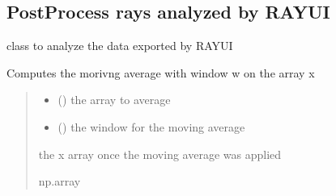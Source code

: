 \documentclass[letterpaper,10pt,english]{sphinxmanual}
\begin{document}
\subsection{PostProcess rays analyzed by RAY\sphinxhyphen{}UI}
\label{\detokenize{API:postprocess-rays-analyzed-by-ray-ui}}

\begin{fulllineitems}
\label{\detokenize{API:raypyng.postprocessing.PostProcessAnalyzed}}
\pysigstartsignatures
\pysigline
{}
\pysigstopsignatures
\sphinxAtStartPar
class to analyze the data exported by RAY\sphinxhyphen{}UI

\begin{fulllineitems}
\label{\detokenize{API:raypyng.postprocessing.PostProcessAnalyzed.moving_average}}
\pysigstartsignatures
\pysiglinewithargsret
{}
{\sphinxparamcomma {}}
{}
\pysigstopsignatures
\sphinxAtStartPar
Computes the morivng average with window w on the array x
\begin{quote}\begin{description}
\begin{itemize}
\item {} 
\sphinxAtStartPar
{} () \textendash{} the array to average

\item {} 
\sphinxAtStartPar
{} () \textendash{} the window for the moving average

\end{itemize}

\sphinxAtStartPar
the x array once the moving average was applied

\sphinxAtStartPar
np.array

\end{description}\end{quote}


\end{fulllineitems}
\end{fulllineitems}
\end{document}
